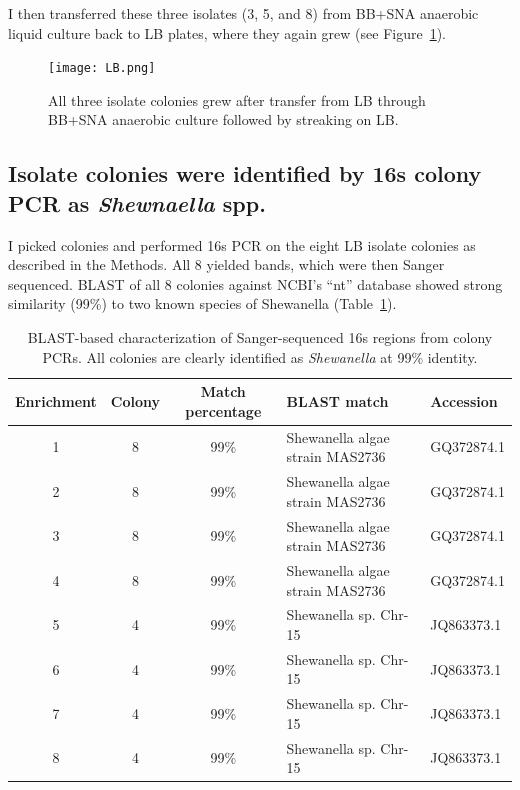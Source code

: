 \documentclass{article}
\begin{document}
I then transferred these three isolates (3, 5, and 8) from BB+SNA
anaerobic liquid culture back to LB plates, where they again grew
(see Figure~\ref{fig:LB}).

\begin{figure}[!ht]
  \centerline{\texttt{[image: LB.png]}}
  \caption{All three isolate colonies grew after transfer from LB
    through BB+SNA anaerobic culture followed by streaking on LB.}
  \label{fig:LB}
\end{figure}

\subsection*{Isolate colonies were identified by 16s colony PCR as {\em Shewnaella} spp.}

I picked colonies and performed 16s PCR on the eight LB isolate
colonies as described in the Methods.  All 8 yielded bands, which were
then Sanger sequenced.  BLAST of all 8 colonies against NCBI's ``nt''
database showed strong similarity (99\%) to two known species of
Shewanella (Table~\ref{tab:16s}).

\begin{table}
\centering
\begin{tabular}{|c|c|c|l|l|}
\hline
Enrichment & Colony & Match percentage & BLAST match & Accession \\
\hline
1 &
8 &
99\% &
Shewanella algae strain MAS2736 &
GQ372874.1 \\

2 &
8 &
99\% &
Shewanella algae strain MAS2736 &
GQ372874.1 \\

3 &
8 &
99\% &
Shewanella algae strain MAS2736 &
GQ372874.1 \\

4 &
8 &
99\% &
Shewanella algae strain MAS2736 &
GQ372874.1 \\

5 &
4 &
99\% &
Shewanella sp. Chr-15 &
JQ863373.1 \\

6 &
4 &
99\% &
Shewanella sp. Chr-15 &
JQ863373.1 \\

7 &
4 &
99\% &
Shewanella sp. Chr-15 &
JQ863373.1 \\

8 &
4 &
99\% &
Shewanella sp. Chr-15 &
JQ863373.1 \\
\hline
\end{tabular}
\caption{BLAST-based characterization of Sanger-sequenced 16s regions from colony PCRs.  All colonies are clearly identified as {\em Shewanella} at 99\% identity.}
\label{tab:16s}
\end{table}
\end{document}
